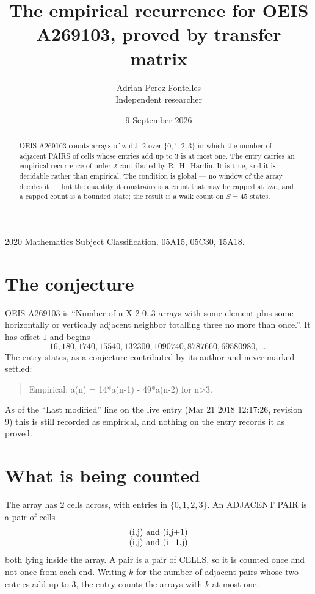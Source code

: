\documentclass[11pt,a4paper]{article}
\title{The empirical recurrence for OEIS A269103, proved by transfer matrix}
\author{Adrian Perez Fontelles\\ \small Independent researcher}
\date{9 September 2026}
\theoremstyle{plain}
\theoremstyle{definition}
\begin{document}
\maketitle

\begin{abstract}
OEIS A269103 counts arrays of width $2$ over $\{0,1,2,3\}$ in which the number of adjacent PAIRS of
cells whose entries add up to $3$ is at most one. The entry carries an empirical recurrence of
order $2$ contributed by R.~H.~Hardin. It is true, and it is decidable rather than
empirical. The condition is global --- no window of the array decides it --- but the quantity
it constrains is a count that may be capped at two, and a capped count is a bounded state; the
result is a walk count on $S=45$ states.
\end{abstract}

\noindent\small 2020 Mathematics Subject Classification. 05A15, 05C30, 15A18.\normalsize

\section{The conjecture}

OEIS A269103 is ``Number of n X 2 0..3 arrays with some element plus some horizontally or vertically adjacent neighbor totalling three no more than once.''. It has offset $1$ and begins
\[
16, 180, 1740, 15540, 132300, 1090740, 8787660, 69580980,\ \dots
\]
The entry states, as a conjecture contributed by its author and never marked settled:
\begin{quote}
Empirical: a(n) = 14*a(n-1) - 49*a(n-2) for n>3.
\end{quote}
As of the ``Last modified'' line on the live entry (Mar 21 2018 12:17:26, revision 9) this is still
recorded as empirical, and nothing on the entry records it as proved.

\section{What is being counted}

The array has $2$ cells across, with entries in $\{0,1,2,3\}$. An ADJACENT PAIR is a pair of cells
\[
\begin{array}{l}
$(i,j)\text{ and }(i,j{+}1)$ \\
$(i,j)\text{ and }(i{+}1,j)$ \\
\end{array}
\]
both lying inside the array. A pair is a pair of CELLS, so it is counted once and not once from
each end. Writing $k$ for the number of adjacent pairs whose two entries add up to $3$, the
entry counts the arrays with $k$ at most one.
\end{document}
